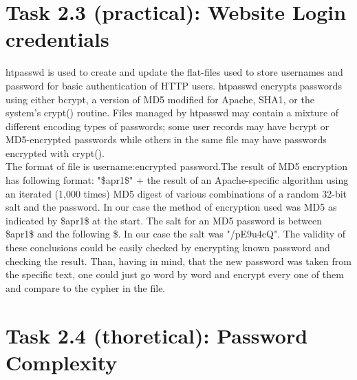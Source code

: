 \documentclass{article}
\begin{document}
\section*{Task 2.3 (practical): Website Login credentials}
htpasswd is used to create and update the flat-files used to store usernames and password for basic authentication of HTTP users. htpasswd encrypts passwords using either bcrypt, a version of MD5 modified for Apache, SHA1, or the system's crypt() routine. Files managed by htpasswd may contain a mixture of different encoding types of passwords; some user records may have bcrypt or MD5-encrypted passwords while others in the same file may have passwords encrypted with crypt().
\\
The format of file is username:encrypted password.The result of MD5 encryption has following format:
"{\$}apr1{\$}" + the result of an Apache-specific algorithm using an iterated (1,000 times) MD5 digest of various combinations of a random 32-bit salt and the password. In our case the method of encryption used was MD5 as indicated by {\$}apr1{\$} at the start. The salt for an MD5 password is between {\$}apr1{\$} and the following {\$}. In our case the salt was "/pE9u4cQ". The validity of these conclusions could be easily checked by encrypting known password and checking the result. Than, having in mind, that the new password was taken from the specific text, one could just go word by word and encrypt every one of them and compare to the cypher in the file.

\section*{Task 2.4 (thoretical): Password Complexity}
\end{document}
